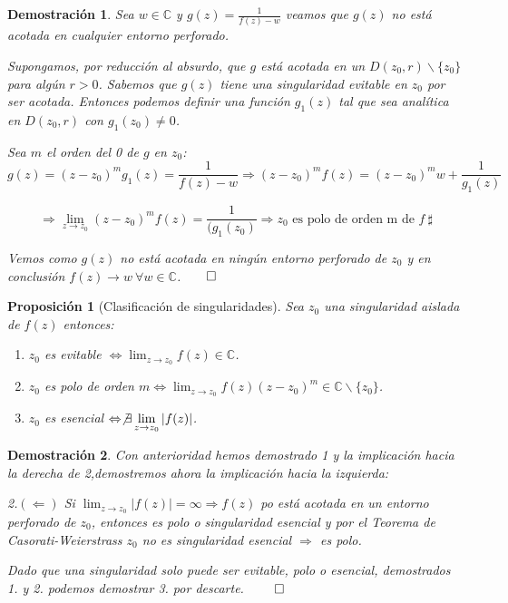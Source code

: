 \documentclass[10pt]{book}
\newtheorem{prop}{Proposición}[chapter]
\newtheorem*{dem}{Demostración}
\newcommand{\C}{\mathbb{C}}
\begin{document}
\begin{dem}
Sea $w\in\C$ y $g(z) = \frac{1}{f(z)-w}$ veamos que $g(z)$ no está acotada en cualquier entorno perforado.

Supongamos, por reducción al absurdo, que $g$ está acotada en un $D(z_0,r)\backslash\{z_0\}$ para algún $r>0$. Sabemos que $g(z)$ tiene una singularidad evitable en $z_0$ por ser acotada. Entonces podemos definir una función $g_1(z)$ tal que sea analítica en $D(z_0,r)$ con $g_1(z_0) \neq 0$.

Sea $m$ el orden del 0 de $g$ en $z_0$:
$$g(z) = (z-z_0)^m g_1(z) = \frac{1}{f(z)-w}\Rightarrow (z-z_0)^m f(z) = (z-z_0)^m w+\frac{1}{g_1(z)}$$

$$\Rightarrow \lim_{z\to z_0} (z-z_0)^m f(z) = \frac{1}{(g_1(z_0)}\Rightarrow z_0 \text{ es polo de orden m de } f\ \sharp$$

Vemos como $g(z)$ no está acotada en ningún entorno perforado de $z_0$ y en conclusión $f(z) \to w\ \forall w\in\C$.$\qed$
\end{dem}

\begin{prop}[Clasificación de singularidades]
Sea $z_0$ una singularidad aislada de $f(z)$ entonces:
\begin{enumerate}
\item $z_0$ es evitable $\displaystyle \Leftrightarrow \lim_{z\to z_0} f(z) \in\C$.
\item $z_0$ es polo de orden $\displaystyle m \Leftrightarrow \lim_{z\to z_0} f(z)(z-z_0)^m \in\C\backslash\{z_0\}$.
\item $z_0$ es esencial $\displaystyle \Leftrightarrow \not \exists \lim_{z\to z_0} |f(z)|$.
\end{enumerate}
\end{prop}

\begin{dem}
Con anterioridad hemos demostrado 1 y la implicación hacia la derecha de 2,demostremos ahora la implicación hacia la izquierda:

2.$(\Leftarrow)$ Si $\lim_{z\to z_0}|f(z)|= \infty \Rightarrow f(z)$ po está acotada en un entorno perforado de $z_0$, entonces es polo o singularidad esencial y por el Teorema de Casorati-Weierstrass $z_0$ no es singularidad esencial $\Rightarrow$ es polo.

Dado que una singularidad solo puede ser evitable, polo o esencial, demostrados 1. y 2. podemos demostrar 3. por descarte. $\qed$

\end{dem}
\end{document}
